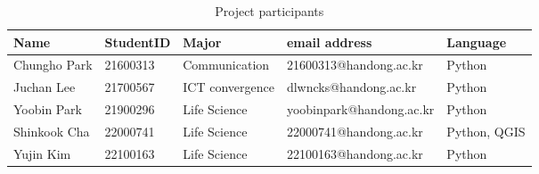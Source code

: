\begin{longtable}[c]{@{}lllll@{}}
    \caption{Project participants}
    \label{tab:my-table}\\
    \toprule
    Name & StudentID & Major & email address & Language \\* \midrule
    \endfirsthead
    \endhead
    \bottomrule
    \endfoot
    \endlastfoot
    Chungho Park & 21600313 & Communication & 21600313@handong.ac.kr & Python \\
    Juchan Lee & 21700567 & ICT convergence & dlwncks@handong.ac.kr  & Python \\
    Yoobin Park & 21900296 & Life Science & yoobinpark@handong.ac.kr & Python \\
    Shinkook Cha & 22000741 & Life Science & 22000741@handong.ac.kr & Python, QGIS \\
    Yujin Kim & 22100163 & Life Science & 22100163@handong.ac.kr & Python \\* \bottomrule
\end{longtable}
